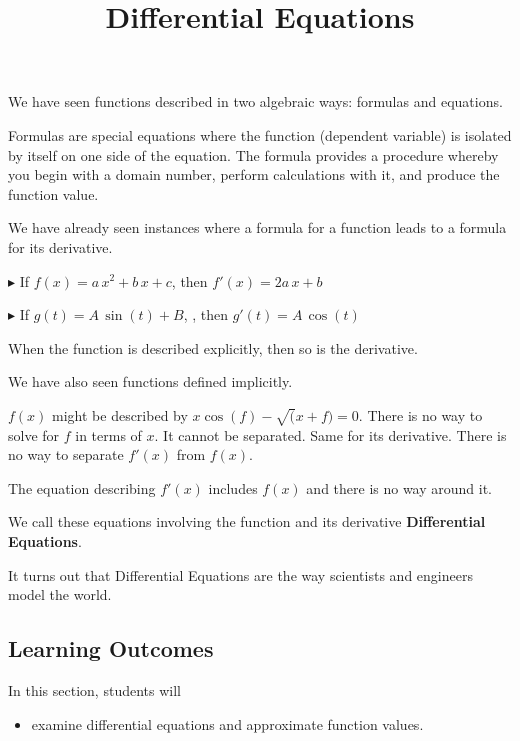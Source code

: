 \documentclass{ximera}
\title{Differential Equations}
\begin{document}
\begin{abstract}
\end{abstract}
\maketitle




We have seen functions described in two algebraic ways: formulas and equations.


Formulas are special equations where the function (dependent variable) is isolated by itself on one side of the equation.  The formula provides a procedure whereby you begin with a domain number, perform calculations with it, and produce the function value.

We have already seen instances where a formula for a function leads to a formula for its derivative. 

$\blacktriangleright$ If $f(x) = a \, x^2  + b \, x + c$, then $f'(x) = 2a \, x + b$

$\blacktriangleright$ If $g(t) = A \, \sin(t) + B$, , then $g'(t) = A \, \cos(t)$


When the function is described explicitly, then so is the derivative.


We have also seen functions defined implicitly.


$f(x)$ might be described by $x \cos(f) - \sqrt(x + f) = 0$.  There is no way to solve for $f$ in terms of $x$. It cannot be separated.  Same for its derivative. There is no way to separate $f'(x)$ from $f(x)$.

The equation describing $f'(x)$ includes $f(x)$ and there is no way around it.


We call these equations involving the function and its derivative \textbf{Differential Equations}.

It turns out that Differential Equations are the way scientists and engineers model the world.










\subsection{Learning Outcomes}


\begin{sectionOutcomes}
In this section, students will 

\begin{itemize}
\item examine differential equations and approximate function values.
\end{itemize}
\end{sectionOutcomes}
\end{document}
